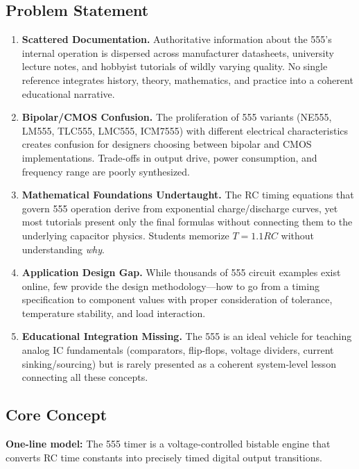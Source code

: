 \documentclass[11pt,letterpaper]{article}
\begin{document}
\subsection{Problem Statement}

\begin{enumerate}[leftmargin=2em]
  \item \textbf{Scattered Documentation.} Authoritative information about the 555's internal operation is dispersed across manufacturer datasheets, university lecture notes, and hobbyist tutorials of wildly varying quality. No single reference integrates history, theory, mathematics, and practice into a coherent educational narrative.

  \item \textbf{Bipolar/CMOS Confusion.} The proliferation of 555 variants (NE555, LM555, TLC555, LMC555, ICM7555) with different electrical characteristics creates confusion for designers choosing between bipolar and CMOS implementations. Trade-offs in output drive, power consumption, and frequency range are poorly synthesized.

  \item \textbf{Mathematical Foundations Undertaught.} The RC timing equations that govern 555 operation derive from exponential charge/discharge curves, yet most tutorials present only the final formulas without connecting them to the underlying capacitor physics. Students memorize $T = 1.1RC$ without understanding \textit{why}.

  \item \textbf{Application Design Gap.} While thousands of 555 circuit examples exist online, few provide the design methodology---how to go from a timing specification to component values with proper consideration of tolerance, temperature stability, and load interaction.

  \item \textbf{Educational Integration Missing.} The 555 is an ideal vehicle for teaching analog IC fundamentals (comparators, flip-flops, voltage dividers, current sinking/sourcing) but is rarely presented as a coherent system-level lesson connecting all these concepts.
\end{enumerate}

\subsection{Core Concept}

\begin{quotebox}
\textbf{One-line model:} The 555 timer is a voltage-controlled bistable engine that converts RC time constants into precisely timed digital output transitions.
\end{quotebox}
\end{document}
